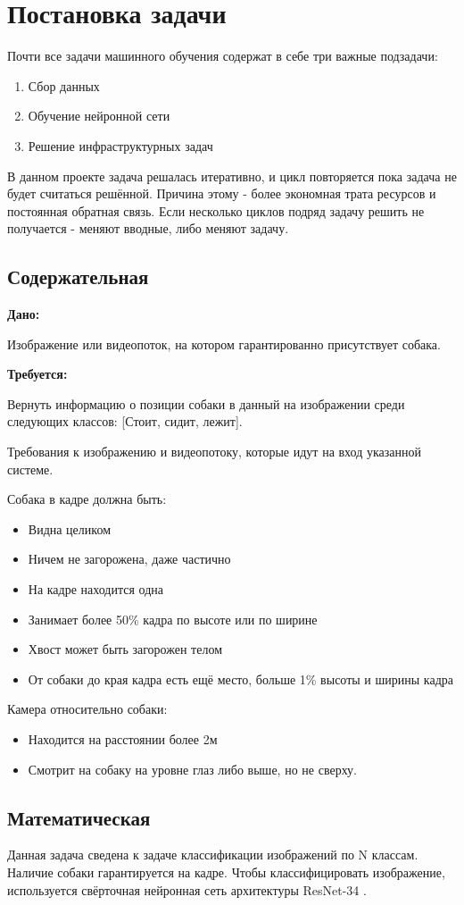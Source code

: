 \chapter{Постановка задачи} \label{chapt2}

Почти все задачи машинного обучения содержат в себе три важные подзадачи:
\begin{enumerate}
    \item Сбор данных
    \item Обучение нейронной сети
    \item Решение инфраструктурных задач
\end{enumerate}

В данном проекте задача решалась итеративно, и цикл повторяется пока задача не будет считаться решённой. Причина этому - более экономная трата ресурсов и постоянная обратная связь. Если несколько циклов подряд задачу решить не получается - меняют вводные, либо меняют задачу. 

\section{Содержательная} \label{sect2_1}
\textbf{Дано: } 

Изображение или видеопоток, на котором гарантированно присутствует собака.

\textbf{Требуется: } 

Вернуть информацию о позиции собаки в данный на изображении среди следующих классов: [Стоит, сидит, лежит].

Требования к изображению и видеопотоку, которые идут на вход указанной системе. 

Собака в кадре должна быть:
\begin{itemize}
    \item Видна целиком
    \item Ничем не загорожена, даже частично
    \item На кадре находится одна
    \item Занимает более 50\% кадра по высоте или по ширине
    \item Хвост может быть загорожен телом 
    \item От собаки до края кадра есть ещё место, больше 1\% высоты и ширины кадра
 \end{itemize}
 
Камера относительно собаки:
\begin{itemize}
    \item Находится на расстоянии более 2м
    \item Смотрит на собаку на уровне глаз либо выше, но не сверху.
\end{itemize}

\section{Математическая} \label{sect2_2}
Данная задача сведена к задаче классификации изображений по N классам. Наличие собаки гарантируется на кадре. Чтобы классифицировать изображение, используется свёрточная нейронная сеть архитектуры ResNet-34 \cite{resnet}.
